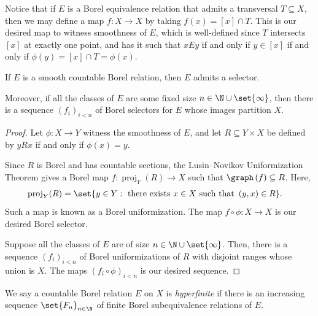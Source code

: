 \documentclass[10pt]{mypackage}
\begin{document}
Notice that if $E$ is a Borel equivalence relation that admits a transversal $T\subseteq X$, then we may define a map $f\colon X\rightarrow X$ by taking $f(x) = [x]\cap T$. This is our desired map to witness smoothness of $E$, which is well-defined since $T$ intersects $[x]$ at exactly one point, and has it such that $xEy$ if and only if $y\in [x]$ if and only if $\phi(y) = [x]\cap T = \phi(x)$.
\begin{proposition}
  If $E$ is a smooth countable Borel relation, then $E$ admits a selector.

  Moreover, if all the classes of $E$ are some fixed size $n\in \N\cup\set{\infty}$, then there is a sequence $\left( f_i \right)_{i < n}$ of Borel selectors for $E$ whose images partition $X$.
\end{proposition}
\begin{proof}
  Let $\phi\colon X\to Y$ witness the smoothness of $E$, and let $R\subseteq Y\times X$ be defined by $yRx$ if and only if $\phi(x) = y$.

  Since $R$ is Borel and has countable sections, the Lusin--Novikov Uniformization Theorem gives a Borel map $f\colon \operatorname{proj}_Y(R)\to X$ such that $\graph\left( f \right)\subseteq R$. Here,
  \begin{align*}
    \operatorname{proj}_Y(R) &= \set{y\in Y : \text{ there exists }x\in X\text{ such that }\left( y,x \right)\in R}.
  \end{align*}
  Such a map is known as a Borel uniformization. The map $f\circ \phi\colon X\rightarrow X$ is our desired Borel selector.

  Suppose all the classes of $E$ are of size $n\in \N\cup\set{\infty}$. Then, there is a sequence $\left( f_i \right)_{i < n}$ of Borel uniformizations of $R$ with disjoint ranges whose union is $X$. The maps $\left( f_i\circ \phi \right)_{i < n}$ is our desired sequence.
\end{proof}
We say a countable Borel relation $E$ on $X$ is \textit{hyperfinite} if there is an increasing sequence $\set{F_n}_{n\in \N}$ of finite Borel subequivalence relations of $E$.
\end{document}
